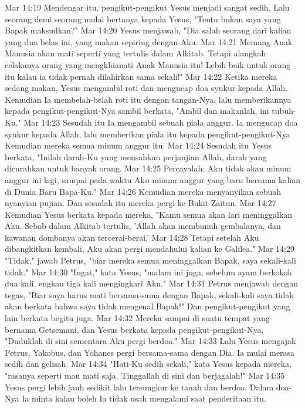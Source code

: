 Mar 14:19  Mendengar itu, pengikut-pengikut Yesus menjadi sangat sedih. Lalu seorang demi seorang mulai bertanya kepada Yesus, "Tentu bukan saya yang Bapak maksudkan?"
Mar 14:20  Yesus menjawab, "Dia salah seorang dari kalian yang dua belas ini, yang makan sepiring dengan Aku.
Mar 14:21  Memang Anak Manusia akan mati seperti yang tertulis dalam Alkitab. Tetapi alangkah celakanya orang yang mengkhianati Anak Manusia itu! Lebih baik untuk orang itu kalau ia tidak pernah dilahirkan sama sekali!"
Mar 14:22  Ketika mereka sedang makan, Yesus mengambil roti dan mengucap doa syukur kepada Allah. Kemudian Ia membelah-belah roti itu dengan tangan-Nya, lalu memberikannya kepada pengikut-pengikut-Nya sambil berkata, "Ambil dan makanlah, ini tubuh-Ku."
Mar 14:23  Sesudah itu Ia mengambil sebuah piala anggur. Ia mengucap doa syukur kepada Allah, lalu memberikan piala itu kepada pengikut-pengikut-Nya Kemudian mereka semua minum anggur itu.
Mar 14:24  Sesudah itu Yesus berkata, "Inilah darah-Ku yang mensahkan perjanjian Allah, darah yang dicurahkan untuk banyak orang.
Mar 14:25  Percayalah: Aku tidak akan minum anggur ini lagi, sampai pada waktu Aku minum anggur yang baru bersama kalian di Dunia Baru Bapa-Ku."
Mar 14:26  Kemudian mereka menyanyikan sebuah nyanyian pujian. Dan sesudah itu mereka pergi ke Bukit Zaitun.
Mar 14:27  Kemudian Yesus berkata kepada mereka, "Kamu semua akan lari meninggalkan Aku. Sebab dalam Alkitab tertulis, 'Allah akan membunuh gembalanya, dan kawanan dombanya akan tercerai-berai.'
Mar 14:28  Tetapi setelah Aku dibangkitkan kembali, Aku akan pergi mendahului kalian ke Galilea."
Mar 14:29  "Tidak," jawab Petrus, "biar mereka semua meninggalkan Bapak, saya sekali-kali tidak."
Mar 14:30  "Ingat," kata Yesus, "malam ini juga, sebelum ayam berkokok dua kali, engkau tiga kali mengingkari Aku."
Mar 14:31  Petrus menjawab dengan tegas, "Biar saya harus mati bersama-sama dengan Bapak, sekali-kali saya tidak akan berkata bahwa saya tidak mengenal Bapak!" Dan pengikut-pengikut yang lain berkata begitu juga.
Mar 14:32  Mereka sampai di suatu tempat yang bernama Getsemani, dan Yesus berkata kepada pengikut-pengikut-Nya, "Duduklah di sini sementara Aku pergi berdoa."
Mar 14:33  Lalu Yesus mengajak Petrus, Yakobus, dan Yohanes pergi bersama-sama dengan Dia. Ia mulai merasa sedih dan gelisah.
Mar 14:34  "Hati-Ku sedih sekali," kata Yesus kepada mereka, "rasanya seperti mau mati saja. Tinggallah di sini dan berjagalah!"
Mar 14:35  Yesus pergi lebih jauh sedikit lalu tersungkur ke tanah dan berdoa. Dalam doa-Nya Ia minta kalau boleh Ia tidak usah mengalami saat penderitaan itu.
